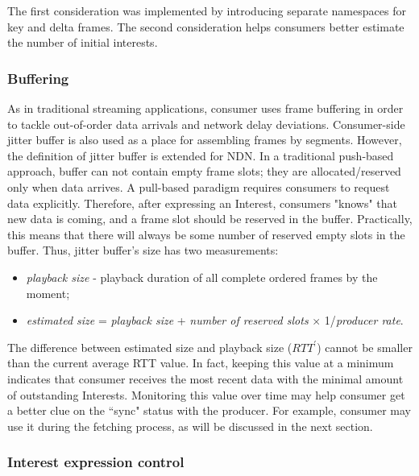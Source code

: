 \documentclass{icn/sig-alternate-2012} %
\begin{document}
The first consideration was implemented by introducing separate namespaces for key and delta frames. The second consideration helps consumers better estimate the number of initial interests.

\subsubsection{Buffering}


As in traditional streaming applications, consumer uses frame buffering in order to tackle out-of-order data arrivals and network delay deviations. Consumer-side jitter buffer is also used as a place for assembling frames by segments. However, the definition of jitter buffer is extended for NDN. In a traditional push-based approach, buffer can not contain empty frame slots; they are allocated/reserved only when data arrives. A pull-based paradigm requires consumers to request data explicitly. Therefore, after expressing an Interest, consumers "knows" that new data is coming, and a frame slot should be reserved in the buffer. Practically, this means that there will always be some number of reserved empty slots in the buffer. Thus, jitter buffer's size has two measurements:
\begin{itemize}[label={}]
\item \textit{playback size} - playback duration of all complete ordered frames by the moment;
\item \textit{estimated size} = \textit{playback size} + \textit{number of reserved slots} $\times$ 1/\textit{producer rate}.
\end{itemize}

The difference between estimated size and playback size ($RTT^{\prime}$) cannot be smaller than the current average RTT value. In fact, keeping this value at a minimum indicates that consumer receives the most recent data with the minimal amount of outstanding Interests. Monitoring this value over time may help consumer get a better clue on the ``sync" status with the producer. For example, consumer may use it during the fetching process, as will be discussed in the next section. 

\subsubsection{Interest expression control}
\end{document}
